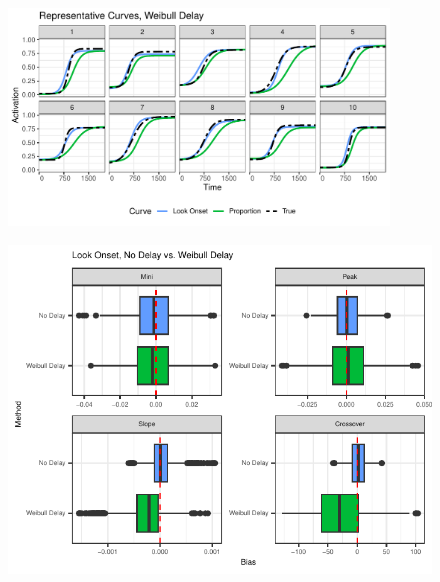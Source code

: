 \documentclass{beamer}
\begin{document}
\begin{frame}
\begin{figure}[H]
\centering
\includegraphics[width=0.9\textwidth]{rep_curves_weibull_delay.pdf}
\label{fig:rep_curves_no_delay}
\end{figure}
\end{frame}




\begin{frame}
\begin{figure}[H]
\centering
\includegraphics{compare_bar_plot.pdf}
\label{fig:par_bias_no_delay}
\end{figure}
\end{frame}
\end{document}
